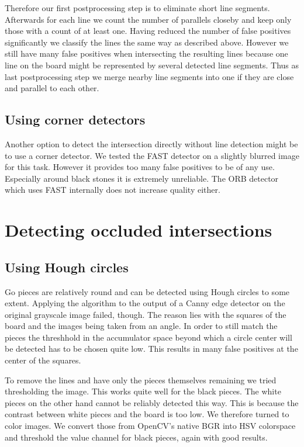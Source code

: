 	Therefore our first postprocessing step is to eliminate short line segments. Afterwards for each line we count the number of parallels closeby and keep only those with a count of at least one. Having reduced the number of false positives significantly we classify the lines the same way as described above. However we still have many false positives when intersecting the resulting lines because one line on the board might be represented by several detected line segments. Thus as last postprocessing step we merge nearby line segments into one if they are close and parallel to each other.

	\subsection{Using corner detectors}
	Another option to detect the intersection directly without line detection might be to use a corner detector. We tested the FAST \cite{} detector on a slightly blurred image for this task. However it provides too many false positives to be of any use. Especially around black stones it is extremely unreliable. The ORB detector which uses FAST internally does not increase quality either.

	\section{Detecting occluded intersections}
	\subsection{Using Hough circles}
	Go pieces are relatively round and can be detected using Hough circles to some extent. Applying the algorithm to the output of a Canny edge detector on the original grayscale image failed, though. The reason lies with the squares of the board and the images being taken from an angle. In order to still match the pieces the threshhold in the accumulator space beyond which a circle center will be detected has to be chosen quite low. This results in many false positives at the center of the squares.

	To remove the lines and have only the pieces themselves remaining we tried thresholding the image. This works quite well for the black pieces. The white pieces on the other hand cannot be reliably detected this way. This is because the contrast between white pieces and the board is too low. We therefore turned to color images. We convert those from OpenCV's native BGR into HSV colorspace and threshold the value channel for black pieces, again with good results.

